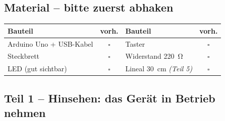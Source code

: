 \documentclass[a4paper,12pt]{scrartcl}
\begin{document}
\vspace{4pt}

\subsection*{Material -- bitte zuerst abhaken}

\begin{center}
\begin{tabular}{p{6.3cm} c p{6.3cm} c}
\toprule
\textbf{Bauteil} & \textbf{vorh.} & \textbf{Bauteil} & \textbf{vorh.} \\
\midrule
Arduino Uno + USB-Kabel & $\square$ & Taster & $\square$ \\
Steckbrett & $\square$ & Widerstand \SI{220}{\ohm} & $\square$ \\
LED (gut sichtbar) & $\square$ & Lineal \SI{30}{\centi\meter} \emph{(Teil 5)} & $\square$ \\
\bottomrule
\end{tabular}
\end{center}

\subsection*{Teil 1 -- Hinsehen: das Gerät in Betrieb nehmen}
\end{document}
